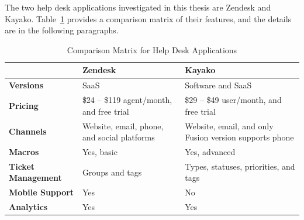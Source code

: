 The two help desk applications investigated in this thesis are Zendesk and Kayako. Table~\ref{tab:comp_matr_help} provides a comparison matrix of their features, and the details are in the following paragraphs.

\begin{table}[!ht]
\begin{center}
	\caption[Comparison Matrix for Help Desk Applications]{Comparison Matrix for Help Desk Applications} \label{tab:comp_matr_help}
    \begin{tabular}{ | p{3cm} | p{5cm} | p{5cm} | }
	\hline
	& \textbf{Zendesk} & \textbf{Kayako} \\ \hline
	\textbf{Versions} & SaaS & Software and SaaS \\ \hline
	\textbf{Pricing} & \$24 -- \$119 agent/month, and free trial & \$29 -- \$49 user/month, and free trial \\ \hline
	\textbf{Channels} & Website, email, phone, and social platforms & Website, email, and only Fusion version supports phone \\ \hline
	\textbf{Macros} & Yes, basic & Yes, advanced \\ \hline
	\textbf{Ticket Management} & Groups and tags & Types, statuses, priorities, and tags \\ \hline
	\textbf{Mobile Support} & Yes & No \\ \hline
	\textbf{Analytics} & Yes & Yes \\ \hline
    \end{tabular}
\end{center}
\end{table}

